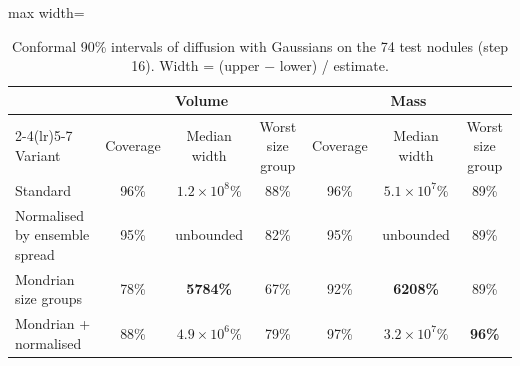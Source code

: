 \begin{table}[!htbp]
\centering\small
\caption{Conformal 90\% intervals of diffusion with Gaussians on the 74 test nodules (step 16). Width = (upper $-$ lower) / estimate.}
\label{tab:uq}
\begin{adjustbox}{max width=\linewidth}
\begin{tabular}{l ccc ccc}
\toprule
 & \multicolumn{3}{c}{Volume} & \multicolumn{3}{c}{Mass} \\
\cmidrule(lr){2-4}\cmidrule(lr){5-7}
Variant & Coverage & Median width & Worst size group & Coverage & Median width & Worst size group \\
\midrule
Standard & 96\% & $1.2\times10^{8}\%$ & 88\% & 96\% & $5.1\times10^{7}\%$ & 89\% \\
Normalised by ensemble spread & 95\% & unbounded & 82\% & 95\% & unbounded & 89\% \\
Mondrian size groups & 78\% & \textbf{5784\%} & 67\% & 92\% & \textbf{6208\%} & 89\% \\
Mondrian + normalised & 88\% & $4.9\times10^{6}\%$ & 79\% & 97\% & $3.2\times10^{7}\%$ & \textbf{96\%} \\
\bottomrule
\end{tabular}
\end{adjustbox}
\end{table}


